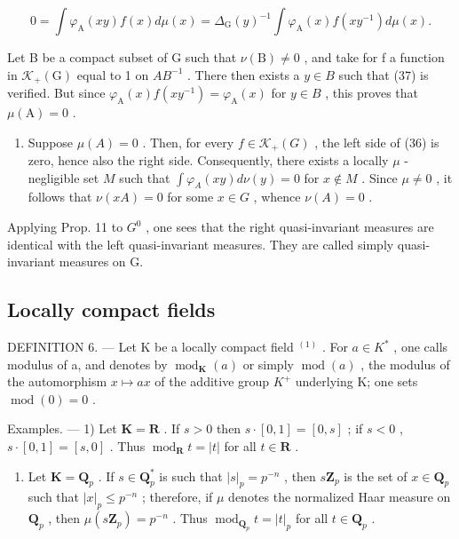 \[
0 = \int \varphi_ {\mathrm{A}} (x y) f (x) d \mu (x) = \Delta_ {\mathrm{G}} (y) ^ {- 1} \int \varphi_ {\mathrm{A}} (x) f (x y ^ {- 1}) d \mu (x).\tag{37}
\]

Let B be a compact subset of G such that \(\nu(\mathrm{B})\neq0\) , and take for f a function in \(\mathcal{K}_{+}(\mathrm{G})\) equal to 1 on \(AB^{-1}\) . There then exists a \(y\in B\) such that (37) is verified. But since \(\varphi_{\mathrm{A}}(x)f(xy^{-1})=\varphi_{\mathrm{A}}(x)\) for \(y\in B\) , this proves that \(\mu(\mathrm{A})=0\) .

\begin{enumerate}
\def\labelenumi{\alph{enumi})}
\setcounter{enumi}{2}
\tightlist
\item
  Suppose \(\mu(A) = 0\) . Then, for every \(f \in \mathcal{K}_{+}(G)\) , the left side of (36) is zero, hence also the right side. Consequently, there exists a locally \(\mu\) -negligible set \(M\) such that \(\int \varphi_{A}(xy) d\nu(y) = 0\) for \(x \notin M\) . Since \(\mu \neq 0\) , it follows that \(\nu(xA) = 0\) for some \(x \in G\) , whence \(\nu(A) = 0\) .
\end{enumerate}

Applying Prop. 11 to \(G^{0}\) , one sees that the right quasi-invariant measures are identical with the left quasi-invariant measures. They are called simply quasi-invariant measures on G.

\subsection{Locally compact fields}

DEFINITION 6. --- Let K be a locally compact field \(^{(1)}\) . For \(a \in K^{*}\) , one calls modulus of a, and denotes by \(\operatorname{mod}_{\mathbf{K}}(a)\) or simply \(\operatorname{mod}(a)\) , the modulus of the automorphism \(x \mapsto ax\) of the additive group \(K^{+}\) underlying K; one sets \(\operatorname{mod}(0) = 0\) .

Examples. --- 1) Let \(\mathbf{K} = \mathbf{R}\) . If \(s > 0\) then \(s \cdot [0,1] = [0,s]\) ; if \(s < 0\) , \(s \cdot [0,1] = [s,0]\) . Thus \(\operatorname{mod}_{\mathbf{R}} t = |t|\) for all \(t \in \mathbf{R}\) .

\begin{enumerate}
\def\labelenumi{\arabic{enumi})}
\setcounter{enumi}{1}
\tightlist
\item
  Let \(\mathbf{K} = \mathbf{Q}_p\) . If \(s \in \mathbf{Q}_p^*\) is such that \(|s|_p = p^{-n}\) , then \(s\mathbf{Z}_p\) is the set of \(x \in \mathbf{Q}_p\) such that \(|x|_p \leqslant p^{-n}\) ; therefore, if \(\mu\) denotes the normalized Haar measure on \(\mathbf{Q}_p\) , then \(\mu(s\mathbf{Z}_p) = p^{-n}\) . Thus \(\operatorname{mod}_{\mathbf{Q}_p} t = |t|_p\) for all \(t \in \mathbf{Q}_p\) .
\end{enumerate}

